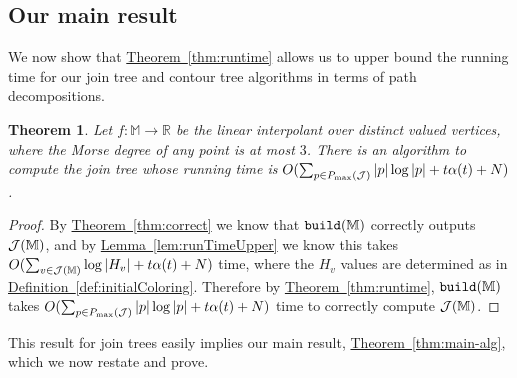 \documentclass[11pt]{article}
\newtheorem{theorem}{Theorem}[section]
\theoremstyle{definition}
\newcommand{\cJ}{{\cal J}}
\newcommand{\MM}{\mathbb{M}}
\newcommand{\RR}{\mathbb{R}}
\newcommand{\Thm}[1]{\hyperref[thm:#1]{Theorem~\ref*{thm:#1}}} %
\newcommand{\Lem}[1]{\hyperref[lem:#1]{Lemma~\ref*{lem:#1}}} %
\newcommand{\Def}[1]{\hyperref[def:#1]{Definition~\ref*{def:#1}}} %
\newcommand{\build}{{\tt build}}
\newcommand{\pmax}{P_{\max}}
\begin{document}
\subsection{Our main result}
\label{sec:implications}

We now show that \Thm{runtime} allows us to upper bound the running time for our join tree and contour 
tree algorithms in terms of path decompositions.

\begin{theorem}
Let $f:\MM \to \RR$ be the linear interpolant over distinct valued vertices, where the Morse degree of any point is at most $3$.
There is an algorithm to compute the join tree whose running time is $O(\sum_{p \in \pmax(\cJ)} |p|\log |p| + t\alpha(t) + N)$.
\end{theorem}
\begin{proof}
By \Thm{correct} we know that $\build(\MM)$ correctly outputs $\cJ(\MM)$, and by \Lem{runTimeUpper}
we know this takes $O(\sum_{v \in \cJ(\MM)} \log |H_v| + t\alpha(t) + N)$ time, where the $H_v$ values are determined as in \Def{initialColoring}.
Therefore by \Thm{runtime}, $\build(\MM)$ takes $O(\sum_{p \in \pmax(\cJ)} |p|\log |p| + t\alpha(t) + N)$ 
time to correctly compute $\cJ(\MM)$.
\end{proof}

This result for join trees easily implies our main result, \Thm{main-alg}, which we now restate and prove.
\end{document}
